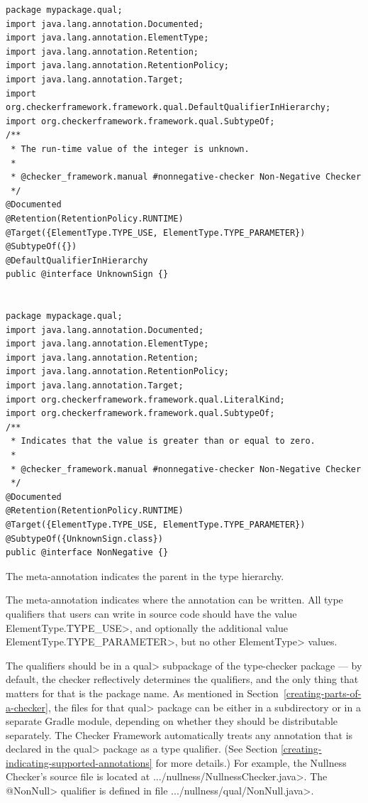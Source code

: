 \begin{Verbatim}
package mypackage.qual;
import java.lang.annotation.Documented;
import java.lang.annotation.ElementType;
import java.lang.annotation.Retention;
import java.lang.annotation.RetentionPolicy;
import java.lang.annotation.Target;
import org.checkerframework.framework.qual.DefaultQualifierInHierarchy;
import org.checkerframework.framework.qual.SubtypeOf;
/**
 * The run-time value of the integer is unknown.
 *
 * @checker_framework.manual #nonnegative-checker Non-Negative Checker
 */
@Documented
@Retention(RetentionPolicy.RUNTIME)
@Target({ElementType.TYPE_USE, ElementType.TYPE_PARAMETER})
@SubtypeOf({})
@DefaultQualifierInHierarchy
public @interface UnknownSign {}


package mypackage.qual;
import java.lang.annotation.Documented;
import java.lang.annotation.ElementType;
import java.lang.annotation.Retention;
import java.lang.annotation.RetentionPolicy;
import java.lang.annotation.Target;
import org.checkerframework.framework.qual.LiteralKind;
import org.checkerframework.framework.qual.SubtypeOf;
/**
 * Indicates that the value is greater than or equal to zero.
 *
 * @checker_framework.manual #nonnegative-checker Non-Negative Checker
 */
@Documented
@Retention(RetentionPolicy.RUNTIME)
@Target({ElementType.TYPE_USE, ElementType.TYPE_PARAMETER})
@SubtypeOf({UnknownSign.class})
public @interface NonNegative {}
\end{Verbatim}

The  meta-annotation
indicates the parent in the type hierarchy.

The 
meta-annotation indicates where the annotation
can be written. All type qualifiers that users can write in source code should
have the value \<ElementType.TYPE\_USE>, and optionally the additional value
\<ElementType.TYPE\_PARAMETER>, but no other \<ElementType> values.

The qualifiers should be in a \<qual> subpackage of the type-checker package ---
by default, the checker reflectively determines the qualifiers, and the only thing that matters for that is the package name.
As mentioned in Section~\ref{creating-parts-of-a-checker}, the files for that \<qual> package can be
either in a subdirectory or in a separate Gradle module, depending on whether
they should be distributable separately.
The Checker Framework automatically treats any annotation that
is declared in the \<qual> package as a type qualifier.
(See Section \ref{creating-indicating-supported-annotations} for more details.)
For example, the Nullness Checker's source file is located at
\<.../nullness/NullnessChecker.java>. The \<@NonNull> qualifier is defined in
file \<.../nullness/qual/NonNull.java>.


